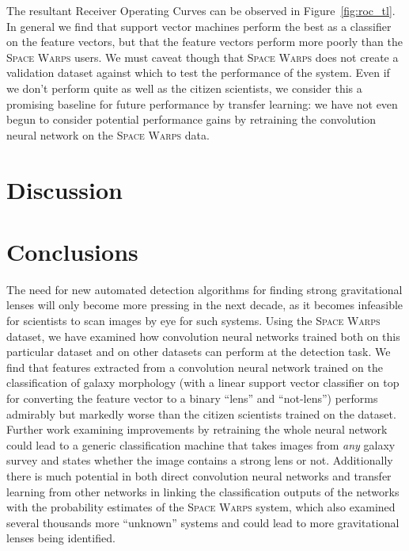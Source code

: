 \documentclass[10pt,twocolumn,letterpaper]{article}
\begin{document}
The resultant Receiver Operating Curves can be observed in
Figure~\ref{fig:roc_tl}. In general we find that support vector machines
perform the best as a classifier on the feature vectors, but that the feature
vectors perform more poorly than the \textsc{Space Warps} users. We must caveat
though that \textsc{Space Warps} does not create a validation dataset against
which to test the performance of the system. Even if we don't perform quite as
well as the citizen scientists, we consider this a
promising baseline for future performance by transfer learning: we have not
even begun to consider potential performance gains by retraining the
convolution neural network on the \textsc{Space Warps} data.

\section{Discussion}


\section{Conclusions}

The need for new automated detection algorithms for finding strong
gravitational lenses will only become more pressing in the next decade, as it
becomes infeasible for scientists to scan images by eye for such systems. Using
the \textsc{Space Warps} dataset, we have examined how convolution neural
networks trained both on this particular dataset and on other datasets can
perform at the detection task.
We find that features extracted from a convolution neural network trained on
the classification of galaxy morphology (with a linear support vector
classifier on top for converting the feature vector to a binary ``lens'' and
``not-lens'') performs admirably but markedly worse than the citizen scientists
trained on the dataset. Further work examining improvements by retraining the
whole neural network could lead to a generic classification machine that takes
images from \textit{any} galaxy survey and states whether the image contains a
strong lens or not. Additionally there is much potential in both direct
convolution neural networks and transfer learning from other networks in
linking the classification outputs of the networks with the probability
estimates of the \textsc{Space Warps} system, which also examined several
thousands more ``unknown'' systems and could lead to more gravitational lenses
being identified.
\end{document}
